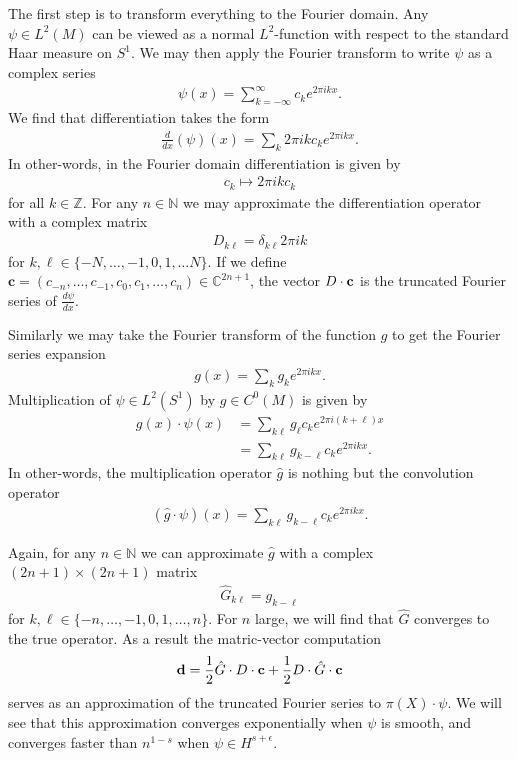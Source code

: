 \documentclass[12pt]{amsart}
\begin{document}
The first step is to transform everything to the Fourier domain.  Any $\psi \in L^2(M)$ can be viewed as a normal $L^2$-function with respect to the standard Haar measure on $S^1$.  We may then apply the Fourier transform to write $\psi$ as a complex series
\begin{align}
	\psi(x) = \sum_{k=-\infty}^\infty c_k e^{2\pi i k x}.
\end{align}
We find that differentiation takes the form
\begin{align}
	\frac{d}{dx} (\psi)(x) = \sum_{k} 2\pi i k c_k e^{2\pi i kx}.
\end{align}
In other-words, in the Fourier domain differentiation is given by
\begin{align}
 	c_k \mapsto 2 \pi ik c_k
\end{align}
for all $k \in \mathbb{Z}$.
For any $n \in \mathbb{N}$ we may approximate the differentiation operator with a complex matrix
\begin{align*}
	D_{k \ell } = \delta_{k \ell } 2\pi i k
\end{align*}
for $k,\ell \in \{ -N , \dots,-1,0,1,\dots N \}$.
If we define $\mathbf{c} = ( c_{-n}, \dots , c_{-1} , c_0 , c_{1},\dots,c_n ) \in \mathbb{C}^{2n+1}$, the vector $D \cdot {\bf c}$ is the truncated Fourier series of $\frac{d\psi}{dx}$.

Similarly we may take the Fourier transform of the function $g$ to get the Fourier series expansion
\begin{align}
	g(x) = \sum_k g_k e^{2\pi i kx}.
\end{align}
Multiplication of $\psi \in L^2(S^1)$ by $g \in C^0(M)$ is given by
\begin{align}
	g(x) \cdot \psi(x) &= \sum_{k \ell} g_\ell c_k e^{2\pi i (k+\ell)x} \\
		&= \sum_{k \ell} g_{k-\ell} c_k e^{2\pi i kx}.
\end{align}
In other-words, the multiplication operator $\hat{g}$ is nothing but the convolution operator
\begin{align}
	( \hat{g} \cdot \psi )(x) = \sum_{k \ell} g_{k-\ell} c_k e^{2\pi i kx}.
\end{align}

Again, for any $n \in \mathbb{N}$ we can approximate $\hat{g}$ with a complex $(2n+1) \times (2n+1)$ matrix
\begin{align}
	\hat{G}_{k\ell} = g_{k - \ell}
\end{align}
for $k,\ell \in \{ -n , \dots,-1,0,1,\dots,n\}$.
For $n$ large, we will find that $\hat{G}$ converges to the true operator.
As a result the matric-vector computation
\begin{align}
	 {\bf d} = \frac{1}{2} \hat{G} \cdot D \cdot {\bf c} + \frac{1}{2} D \cdot \hat{G} \cdot {\bf c}
\end{align}
serves as an approximation of the truncated Fourier series to $\pi(X) \cdot \psi$.
We will see that this approximation converges exponentially when $\psi$ is smooth, and converges faster than $n^{1-s}$ when $\psi \in H^{s + \epsilon}$.
\end{document}
